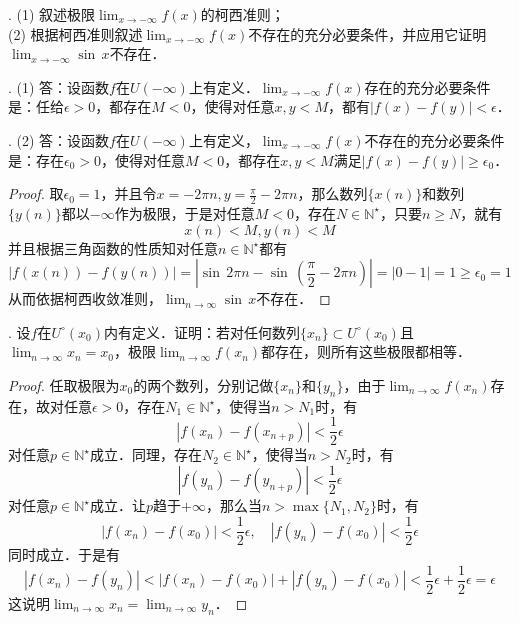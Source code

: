 \documentclass{ctexart}
\theoremstyle{definition}
\theoremstyle{definition}
\theoremstyle{plain}
\theoremstyle{plain}
\theoremstyle{plain}
\theoremstyle{definition}
\newcommand{\nat}{\mathbb{N}^\star}
\begin{document}
\hangindent=13pt
. (1) 叙述极限$\displaystyle\lim_{x \to -\infty} f(x)$的柯西准则；\\
(2) 根据柯西准则叙述$\displaystyle\lim_{x \to -\infty} f(x)$不存在的充分必要条件，并应用它证明$\displaystyle\lim_{x \to -\infty} \sin \, x$不存在．

. (1) 答：设函数$f$在$U(-\infty)$上有定义．$\displaystyle\lim_{x \to -\infty} f(x)$存在的充分必要条件是：任给$\epsilon > 0$，都存在$M < 0$，使得对任意$x, y < M$，都有$|f(x) - f(y)| < \epsilon$．

. (2) 答：设函数$f$在$U(-\infty)$上有定义，$\displaystyle\lim_{x \to -\infty} f(x)$不存在的充分必要条件是：存在$\epsilon_0 > 0$，使得对任意$M < 0$，都存在$x, y < M$满足$|f(x) - f(y)| \geq \epsilon_0$．

\begin{proof}
取$\epsilon_0 = 1$，并且令$\displaystyle x = - 2 \pi n, y = \frac{\pi}{2} - 2 \pi n$，那么数列$\{ x(n) \}$和数列$\{ y(n) \}$都以$-\infty$作为极限，于是对任意$M < 0$，存在$N \in \nat$，只要$n \geq N$，就有
\begin{equation}
    x(n) < M, y(n) < M
\end{equation}
并且根据三角函数的性质知对任意$n \in \nat$都有
\begin{equation}
    |f(x(n)) - f(y(n))| = |\sin \, 2 \pi n - \sin \, \left( \frac{\pi}{2} - 2 \pi n \right)| =|0 - 1| = 1 \geq \epsilon_0 = 1
\end{equation}
从而依据柯西收敛准则，$\displaystyle\lim_{n\to\infty} \sin \, x$不存在．
\end{proof}

. 设$f$在$U^{\circ}(x_0)$内有定义．证明：若对任何数列$\{ x_n \} \subset U^{\circ}(x_0)$且$\displaystyle\lim_{n \to \infty} x_n = x_0$，极限$\displaystyle\lim_{n \to \infty} f(x_n)$都存在，则所有这些极限都相等．
\begin{proof}
任取极限为$x_0$的两个数列，分别记做$\{ x_n \}$和$\{ y_n \}$，由于$\displaystyle\lim_{n\to\infty} f(x_n)$存在，故对任意$\epsilon > 0$，存在$N_1 \in \nat$，使得当$n > N_1$时，有
\begin{equation}
    |f(x_n) - f(x_{n+p})| < \frac{1}{2} \epsilon
\end{equation}
对任意$p \in \nat$成立．同理，存在$N_2 \in \nat$，使得当$n > N_2$时，有
\begin{equation}
    |f(y_n) - f(y_{n+p})| < \frac{1}{2} \epsilon
\end{equation}
对任意$p \in \nat$成立．让$p$趋于$+ \infty$，那么当$n > \max \{ N_1, N_2 \}$时，有
\begin{equation}
    |f(x_n) - f(x_0)| < \frac{1}{2} \epsilon, \quad |f(y_n) - f(x_0)| < \frac{1}{2} \epsilon
\end{equation}
同时成立．于是有
\begin{equation}
    |f(x_n) - f(y_n)| < |f(x_n) -f(x_0)|+|f(y_n)-f(x_0)|<\frac{1}{2}\epsilon+\frac{1}{2}\epsilon = \epsilon
\end{equation}
这说明$\displaystyle\lim_{n\to\infty} x_n = \displaystyle\lim_{n\to\infty}y_n$．
\end{proof}
\end{document}
